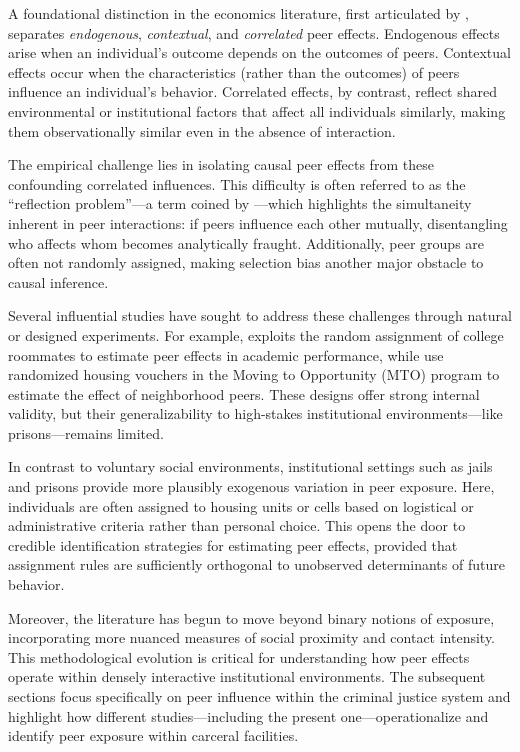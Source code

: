 \documentclass[12pt, a4paper]{article}
\begin{document}
A foundational distinction in the economics literature, first articulated by \citet{manski1993identification}, separates \textit{endogenous}, \textit{contextual}, and \textit{correlated} peer effects. Endogenous effects arise when an individual’s outcome depends on the outcomes of peers. Contextual effects occur when the characteristics (rather than the outcomes) of peers influence an individual’s behavior. Correlated effects, by contrast, reflect shared environmental or institutional factors that affect all individuals similarly, making them observationally similar even in the absence of interaction.

The empirical challenge lies in isolating causal peer effects from these confounding correlated influences. This difficulty is often referred to as the ``reflection problem''—a term coined by \citet{manski1993identification}—which highlights the simultaneity inherent in peer interactions: if peers influence each other mutually, disentangling who affects whom becomes analytically fraught. Additionally, peer groups are often not randomly assigned, making selection bias another major obstacle to causal inference.

Several influential studies have sought to address these challenges through natural or designed experiments. For example, \citet{sacerdote2001peer} exploits the random assignment of college roommates to estimate peer effects in academic performance, while \citet{katz2001moving} use randomized housing vouchers in the Moving to Opportunity (MTO) program to estimate the effect of neighborhood peers. These designs offer strong internal validity, but their generalizability to high-stakes institutional environments—like prisons—remains limited.

In contrast to voluntary social environments, institutional settings such as jails and prisons provide more plausibly exogenous variation in peer exposure. Here, individuals are often assigned to housing units or cells based on logistical or administrative criteria rather than personal choice. This opens the door to credible identification strategies for estimating peer effects, provided that assignment rules are sufficiently orthogonal to unobserved determinants of future behavior.

Moreover, the literature has begun to move beyond binary notions of exposure, incorporating more nuanced measures of social proximity and contact intensity. This methodological evolution is critical for understanding how peer effects operate within densely interactive institutional environments. The subsequent sections focus specifically on peer influence within the criminal justice system and highlight how different studies—including the present one—operationalize and identify peer exposure within carceral facilities.
\end{document}
